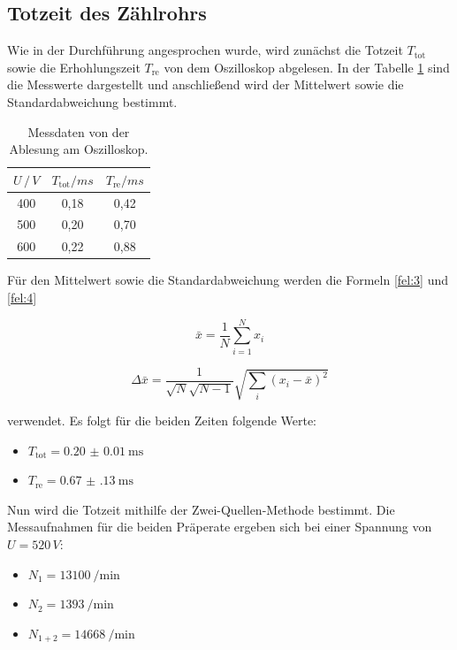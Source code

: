 \subsection{Totzeit des Zählrohrs}
Wie in der Durchführung angesprochen wurde, wird zunächst die Totzeit $T_\text{tot}$ sowie die Erhohlungszeit $T_\text{re}$ von dem Oszilloskop
abgelesen. In der Tabelle \ref{tab:2} sind die Messwerte dargestellt und anschließend wird der Mittelwert sowie die Standardabweichung
bestimmt.
\begin{table}[H]
  \centering
  \caption{Messdaten von der Ablesung am Oszilloskop.}
  \label{tab:2}
  \begin{tabular}{c c c}
    \toprule
    $U \, /\, V$ & $T_\text{tot} / ms$ & $T_\text{re} / ms$\\
    \midrule
    400 & 0,18 & 0,42\\
    500 & 0,20 & 0,70\\
    600 & 0,22 & 0,88\\
    \bottomrule
  \end{tabular}
\end{table}
Für den Mittelwert sowie die Standardabweichung werden die Formeln \ref{fel:3} und \ref{fel:4}

\begin{equation}
    \bar{x} = \frac{1}{N} \sum_{i=1}^{N} x_i
    \label{fel:3}
\end{equation}

\begin{equation}
  \Delta \bar{x} = \frac{1}{\sqrt{N}\sqrt{N-1}} \sqrt{\sum_{i}(x_i-\bar{x})^2}
  \label{fel:4}
\end{equation}

verwendet. Es folgt für die beiden Zeiten folgende Werte:

\begin{itemize}
  \item $T_\text{tot} = \SI{0.20(1)}{\milli\second}$
  \item $T_\text{re} = \SI{0.67(13)}{\milli\second}$
\end{itemize}

Nun wird die Totzeit mithilfe der Zwei-Quellen-Methode bestimmt.
Die Messaufnahmen für die beiden Präperate ergeben sich bei einer Spannung von $U = 520 \, V$:

\begin{itemize}
  \item $N_1 = \SI{13100}{\per\minute}$
  \item $N_2 = \SI{1393}{\per\minute}$
  \item $N_{1+2} = \SI{14668}{\per\minute}$
\end{itemize}

